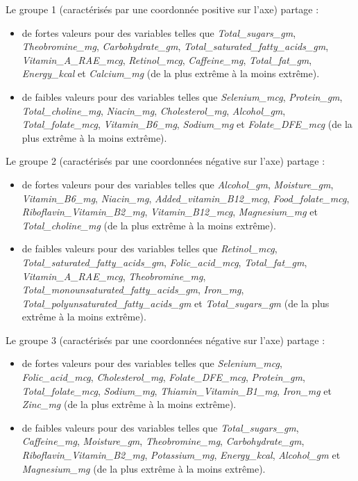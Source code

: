 \documentclass[]{article}
\providecommand{\tightlist}{%
  \setlength{\itemsep}{0pt}\setlength{\parskip}{0pt}}
\begin{document}
Le groupe 1 (caractérisés par une coordonnée positive sur l'axe) partage
:

\begin{itemize}
\tightlist
\item
  de fortes valeurs pour des variables telles que
  \emph{Total\_sugars\_gm}, \emph{Theobromine\_mg},
  \emph{Carbohydrate\_gm}, \emph{Total\_saturated\_fatty\_acids\_gm},
  \emph{Vitamin\_A\_RAE\_mcg}, \emph{Retinol\_mcg}, \emph{Caffeine\_mg},
  \emph{Total\_fat\_gm}, \emph{Energy\_kcal} et \emph{Calcium\_mg} (de
  la plus extrême à la moins extrême).
\item
  de faibles valeurs pour des variables telles que \emph{Selenium\_mcg},
  \emph{Protein\_gm}, \emph{Total\_choline\_mg}, \emph{Niacin\_mg},
  \emph{Cholesterol\_mg}, \emph{Alcohol\_gm}, \emph{Total\_folate\_mcg},
  \emph{Vitamin\_B6\_mg}, \emph{Sodium\_mg} et \emph{Folate\_DFE\_mcg}
  (de la plus extrême à la moins extrême).
\end{itemize}

Le groupe 2 (caractérisés par une coordonnées négative sur l'axe)
partage :

\begin{itemize}
\tightlist
\item
  de fortes valeurs pour des variables telles que \emph{Alcohol\_gm},
  \emph{Moisture\_gm}, \emph{Vitamin\_B6\_mg}, \emph{Niacin\_mg},
  \emph{Added\_vitamin\_B12\_mcg}, \emph{Food\_folate\_mcg},
  \emph{Riboflavin\_Vitamin\_B2\_mg}, \emph{Vitamin\_B12\_mcg},
  \emph{Magnesium\_mg} et \emph{Total\_choline\_mg} (de la plus extrême
  à la moins extrême).
\item
  de faibles valeurs pour des variables telles que \emph{Retinol\_mcg},
  \emph{Total\_saturated\_fatty\_acids\_gm}, \emph{Folic\_acid\_mcg},
  \emph{Total\_fat\_gm}, \emph{Vitamin\_A\_RAE\_mcg},
  \emph{Theobromine\_mg},
  \emph{Total\_monounsaturated\_fatty\_acids\_gm}, \emph{Iron\_mg},
  \emph{Total\_polyunsaturated\_fatty\_acids\_gm} et
  \emph{Total\_sugars\_gm} (de la plus extrême à la moins extrême).
\end{itemize}

Le groupe 3 (caractérisés par une coordonnées négative sur l'axe)
partage :

\begin{itemize}
\tightlist
\item
  de fortes valeurs pour des variables telles que \emph{Selenium\_mcg},
  \emph{Folic\_acid\_mcg}, \emph{Cholesterol\_mg},
  \emph{Folate\_DFE\_mcg}, \emph{Protein\_gm},
  \emph{Total\_folate\_mcg}, \emph{Sodium\_mg},
  \emph{Thiamin\_Vitamin\_B1\_mg}, \emph{Iron\_mg} et \emph{Zinc\_mg}
  (de la plus extrême à la moins extrême).
\item
  de faibles valeurs pour des variables telles que
  \emph{Total\_sugars\_gm}, \emph{Caffeine\_mg}, \emph{Moisture\_gm},
  \emph{Theobromine\_mg}, \emph{Carbohydrate\_gm},
  \emph{Riboflavin\_Vitamin\_B2\_mg}, \emph{Potassium\_mg},
  \emph{Energy\_kcal}, \emph{Alcohol\_gm} et \emph{Magnesium\_mg} (de la
  plus extrême à la moins extrême).
\end{itemize}
\end{document}
